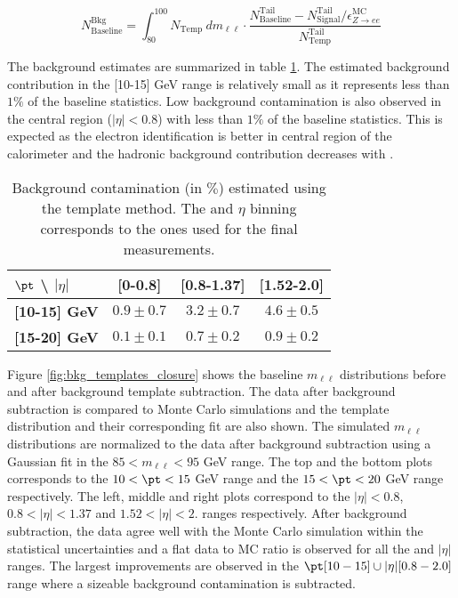 $$ N^{\mathrm{Bkg}}_{\mathrm{Baseline}}=\int_{80}^{100}N_{\mathrm{Temp}}~dm_{\ell\ell} \cdot \frac{N_{\mathrm{Baseline}}^{\mathrm{Tail}}-N_{\mathrm{Signal}}^{\mathrm{Tail}}/\epsilon_{Z\rightarrow ee}^{\mathrm{MC}}}{N_{\mathrm{Temp}}^{\mathrm{Tail}}} $$

   The background estimates are summarized in table \ref{tab:efficiency_bkg_estimates}. The estimated background contribution in the [10-15] GeV \pt range is relatively small as it represents less than $1\%$ of the baseline statistics. Low background contamination is also observed in the central region ($|\eta| < 0.8$) with less than $1\%$ of the baseline statistics. This is expected as the electron identification is better in central region of the calorimeter and the hadronic background contribution decreases with \pt.


\begin{table}[htb!]
        \begin{center}
        \begin{tabular}{|l|c|c|c|} 
        \hline 
        \hline 
        \textbf{$\pt$ \textbackslash{} $|\eta|$} & \textbf{{[}0-0.8{]}} & \textbf{{[}0.8-1.37{]}} & \textbf{{[}1.52-2.0{]}}\tabularnewline
        \hline 
        \hline 
        \textbf{{[}10-15{]} GeV} & $0.9\pm0.7$ & $3.2\pm0.7$ & $4.6\pm0.5$\tabularnewline
        \hline 
        \textbf{{[}15-20{]} GeV} & $0.1\pm0.1$ & $0.7\pm0.2$ & $0.9\pm0.2$\tabularnewline
        \hline 
        \end{tabular}
        \end{center}
        \caption{\label{tab:efficiency_bkg_estimates} Background contamination (in $\%$) estimated using the template method. The \pt and $\eta$ binning corresponds to the ones used for the final measurements.}
\end{table}        


Figure \ref{fig:bkg_templates_closure} shows the baseline $m_{\ell\ell}$ distributions before and after background template subtraction. The data after background subtraction is compared to Monte Carlo simulations and the template distribution and their corresponding fit are also shown. The simulated $m_{\ell\ell}$ distributions are normalized to the data after background subtraction using a Gaussian fit in the $85 < m_{\ell\ell} < 95$ GeV range. The top and the bottom plots corresponds to the $10 < \pt < 15$ GeV range and the $15 < \pt < 20$ GeV range respectively. The left, middle and right plots correspond to the $|\eta| < 0.8$, $0.8 < |\eta| < 1.37$ and $1.52 < |\eta| < 2.$ ranges respectively. After background subtraction, the data agree well with the Monte Carlo simulation within the statistical uncertainties and a flat data to MC ratio is observed for all the \pt and $|\eta|$ ranges. The largest improvements are observed in the $\pt[10-15] \cup |\eta|[0.8-2.0]$ range where a sizeable background contamination is subtracted.

